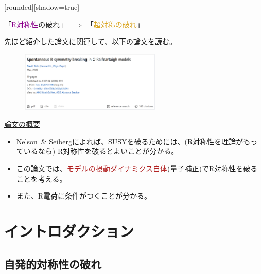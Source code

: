 \documentclass[
  unicode,a4paper,9pt,
  xcolor = {dvipsnames,svgnames},
  hyperref ={colorlinks=true,citecolor=Navy,linkcolor=NavyBlue,urlcolor=purple},
  ja=standard,lualatex
]{beamer}
\begin{document}
\begin{frame}
  [rounded][shadow=true]
  \begin{block}{}
    \centering
    「\textcolor{DarkMagenta}{R対称性}の破れ」
    $\implies$
    「\textcolor{Goldenrod}{超対称の破れ}」
  \end{block}

  先ほど紹介した論文に関連して、以下の論文を読む\cite{Shih:2007av}。

  \begin{figure}
    \centering
    \includegraphics[width=0.6\textwidth]{fig/Shih2007av.PNG}
  \end{figure}

  \uline{論文の概要}

  \begin{itemize}
    \item
          Nelson\ \& Seibergによれば、SUSYを破るためには、(R対称性を理論がもっているなら) R対称性を破るとよいことが分かる。
    \item
          この論文では、\textcolor{FireBrick}{モデルの摂動ダイナミクス自体}(量子補正)でR対称性を破ることを考える。
    \item
          また、R電荷に条件がつくことが分かる。
  \end{itemize}

\end{frame}


\section{イントロダクション}

\begin{frame}[plain]
  \huge \secname
\end{frame}


\subsection{自発的対称性の破れ}
\end{document}
